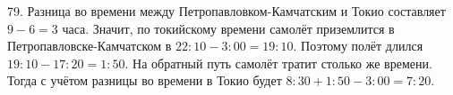 79. Разница во времени между Петропавловком-Камчатским и Токио составляет $9-6=3$ часа. Значит, по токийскому времени самолёт приземлится в Петропавловске-Камчатском в $22:10-3:00=19:10.$ Поэтому полёт длился $19:10-17:20=1:50.$ На обратный путь самолёт тратит столько же времени. Тогда с учётом разницы во времени в Токио будет $8:30+1:50-3:00=7:20.$\\
